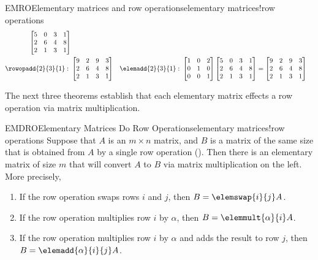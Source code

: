 \begin{example}{EMRO}{Elementary matrices and row operations}{elementary matrices!row operations}
\begin{align*}
\begin{bmatrix}
5 & 0 & 3 & 1\\
2 & 6 & 4 & 8\\
2 & 1 & 3 & 1
\end{bmatrix}\\
%
%
\rowopadd{2}{3}{1}:\ &
\begin{bmatrix}
9 & 2 & 9 & 3\\
2 & 6 & 4 & 8\\
2 & 1 & 3 & 1
\end{bmatrix}
&
\elemadd{2}{3}{1}:\ &
\begin{bmatrix}
1 & 0 & 2\\
0 & 1 & 0\\
0 & 0 & 1
\end{bmatrix}
\begin{bmatrix}
5 & 0 & 3 & 1\\
2 & 6 & 4 & 8\\
2 & 1 & 3 & 1
\end{bmatrix}
=
\begin{bmatrix}
9 & 2 & 9 & 3\\
2 & 6 & 4 & 8\\
2 & 1 & 3 & 1
\end{bmatrix}
%
%
\end{align*}
%
\end{example}
%
The next three theorems establish that each elementary matrix effects a row operation via matrix multiplication.
%
\begin{theorem}{EMDRO}{Elementary Matrices Do Row Operations}{elementary matrices!row operations}
Suppose that $A$ is an $m\times n$ matrix, and $B$ is a matrix of the same size that is obtained from $A$ by a single row operation ().  Then there is an elementary matrix of size $m$ that will convert $A$ to $B$ via matrix multiplication on the left.  More precisely,
\begin{enumerate}
\item  If the row operation swaps rows $i$ and $j$,
then $B=\elemswap{i}{j}A$.
\item  If the row operation multiplies row $i$ by $\alpha$,
then $B=\elemmult{\alpha}{i}A$.
\item  If the row operation multiplies row $i$ by $\alpha$ and adds the result to row $j$,
then $B=\elemadd{\alpha}{i}{j}A$.
\end{enumerate}
\end{theorem}
%
